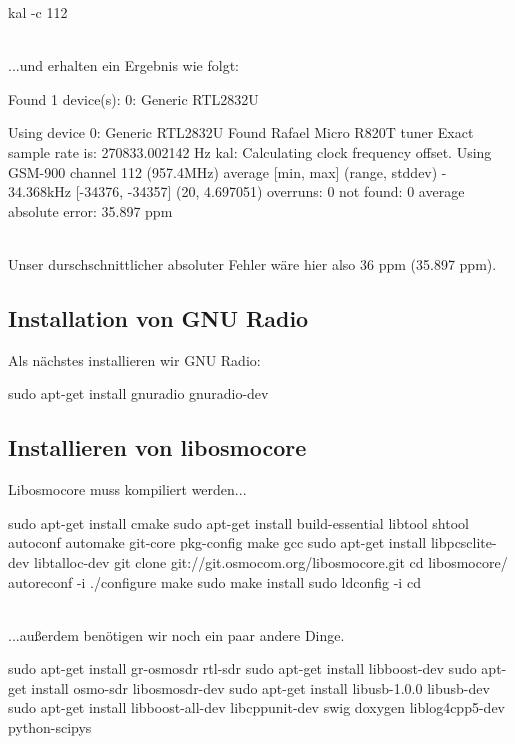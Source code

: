 \begin{code}
kal -c 112 
\end{code}

\noindent\\...und erhalten ein Ergebnis wie folgt:

\begin{code}
Found 1 device(s):
  0:  Generic RTL2832U

Using device 0: Generic RTL2832U
Found Rafael Micro R820T tuner
Exact sample rate is: 270833.002142 Hz
kal: Calculating clock frequency offset.
Using GSM-900 channel 112 (957.4MHz)
average		[min, max]	(range, stddev)
- 34.368kHz		[-34376, -34357]	(20, 4.697051)
overruns: 0
not found: 0
average absolute error: 35.897 ppm
\end{code}

\noindent\\Unser durschschnittlicher absoluter Fehler wäre hier also 36 ppm (35.897 ppm).

\subsection{Installation von GNU Radio}

Als nächstes installieren wir GNU Radio:

\begin{code}
sudo apt-get install gnuradio gnuradio-dev
\end{code}

\subsection{Installieren von libosmocore}

Libosmocore muss kompiliert werden...

\begin{code}[numbers=left, stepnumber=1]
sudo apt-get install cmake
sudo apt-get install build-essential libtool shtool autoconf automake git-core pkg-config make gcc
sudo apt-get install libpcsclite-dev libtalloc-dev
git clone git://git.osmocom.org/libosmocore.git
cd libosmocore/
autoreconf -i
./configure
make
sudo make install
sudo ldconfig -i
cd
\end{code}

\noindent\\...außerdem benötigen wir noch ein paar andere Dinge.

\begin{code}[numbers=left, stepnumber=1]
sudo apt-get install gr-osmosdr rtl-sdr
sudo apt-get install libboost-dev
sudo apt-get install osmo-sdr libosmosdr-dev
sudo apt-get install libusb-1.0.0 libusb-dev
sudo apt-get install libboost-all-dev libcppunit-dev swig doxygen liblog4cpp5-dev python-scipys
\end{code}

